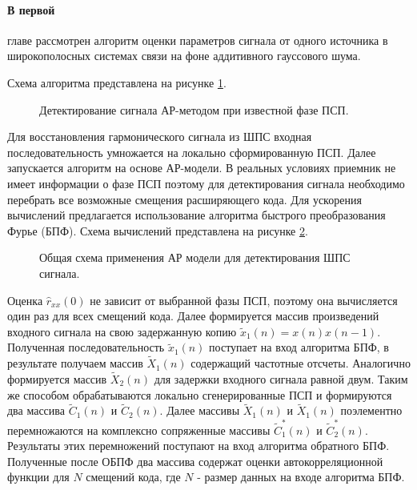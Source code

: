 \paragraph{В первой} главе рассмотрен алгоритм оценки параметров сигнала от одного источника в широкополосных системах связи на
фоне аддитивного гауссового  шума.

Схема алгоритма представлена на рисунке \ref{pic:ar_cdma1_scheme1}.

\begin{figure}[H]
	\center{}
	\caption{Детектирование сигнала АР-методом при известной фазе ПСП.}
	\label{pic:ar_cdma1_scheme1}
\end{figure}

Для восстановления гармонического сигнала из ШПС входная последовательность умножается на локально сформированную ПСП.
Далее запускается алгоритм на основе АР-модели. В реальных условиях приемник не имеет информации о фазе ПСП поэтому для детектирования
сигнала необходимо перебрать все возможные смещения расширяющего кода. Для ускорения вычислений предлагается использование алгоритма быстрого преобразования Фурье (БПФ).
Схема вычислений представлена на рисунке \ref{pic:ar_cdma1_scheme2}.

\begin{figure}[H]
	\center{}
	\caption{Общая схема применения АР модели для детектирования ШПС сигнала.}
	\label{pic:ar_cdma1_scheme2}
\end{figure}

Оценка ${\hat{r}_{xx}(0)}$ не зависит от выбранной фазы ПСП, поэтому она вычисляется один
раз для всех смещений кода. Далее формируется массив произведений входного сигнала на
свою задержанную копию ${\tilde{x}_1(n)=x(n)x(n-1)}$. Полученная последовательность  
${\tilde{x}_1(n)}$ поступает на вход алгоритма БПФ, в результате получаем массив ${\tilde{X}_1(n)}$
содержащий частотные отсчеты. Аналогично формируется массив  ${\tilde{X}_2(n)}$ для
задержки входного сигнала равной двум. Таким же способом обрабатываются локально
сгенерированные ПСП и формируются два массива ${\tilde{C}_1(n)}$ и ${\tilde{C}_2(n)}$.
Далее массивы ${\tilde{X}_1(n)}$ и ${\tilde{X}_1(n)}$ поэлементно перемножаются
на комплексно сопряженные массивы ${\tilde{C}_1^*(n)}$ и ${\tilde{C}_2^*(n)}$.
Результаты этих перемножений поступают на вход алгоритма обратного
БПФ. Полученные после ОБПФ два массива содержат оценки автокорреляционной функции для ${N}$ 
смещений кода, где  ${N}$ - размер данных на входе алгоритма БПФ.

